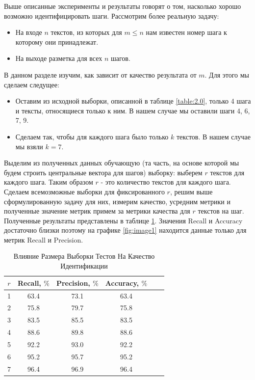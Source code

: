 \documentclass[12pt]{article}
\begin{document}
Выше описанные эксперименты и результаты говорят о том, насколько хорошо возможно идентифицировать шаги. Рассмотрим более реальную задачу:

\begin{itemize}
	\item На входе $n$ текстов, из которых для $m\leq n$ нам известен номер шага к которому они принадлежат.
	\item На выходе разметка для всех $n$ шагов.
\end{itemize}

В данном разделе изучим, как зависит от качество результата от $m$. Для этого мы сделаем следущее:
\begin{itemize}
	\item Оставим из исходной выборки, описанной в таблице \ref{table:2.0}, только 4 шага и тексты, относящиеся только к ним. В нашем случае мы оставили шаги 4, 6, 7, 9.
	\item Сделаем так, чтобы для каждого шага было только $k$ текстов. В нашем случае мы взяли $k=7$.
\end{itemize}
Выделим из полученных данных обучающую (та часть, на основе которой мы будем строить центральные вектора для шагов) выборку: выберем $r$ текстов для каждого шага. Таким образом $r$ - это количество текстов для каждого шага. Сделаем всемозможные выборки для фиксированного $r$, решим выше сформулированную задачу для них, измерим качество, усредним метрики и полученные значение метрик примем за метрики качества для $r$ текстов на шаг. Полученные результаты представлены в таблице \ref{table:5}. Значения Recall и Accuracy достаточно близки поэтому на графике \ref{fig:image1} находится данные только для метрик Recall и Precision.

\begin{table}[h!]
\centering
\begin{tabular}{||c|c|c|c|c|c||}
\hline
$r$ & Recall, $\%$ &Precision, $\%$ &Accuracy, $\%$ \\
\hline
1 &	63.4 &	73.1 &	63.4 \\
\hline
2 &	75.8 &	79.7 &	75.8 \\
\hline
3 &	83.5 &	85.5 &	83.5 \\
\hline
4 &	88.6 &	89.8 &	88.6\\
\hline
5 &	92.2 &	93.0 &	92.2\\
\hline
6 &	95.2 &	95.7 &	95.2\\
\hline
7 &	96.4 &	96.9 &	96.4\\
\hline
\end{tabular}
\caption{Влияние Размера Выборки Тестов На Качество Идентификации}
\label{table:5}
\end{table}
\end{document}
